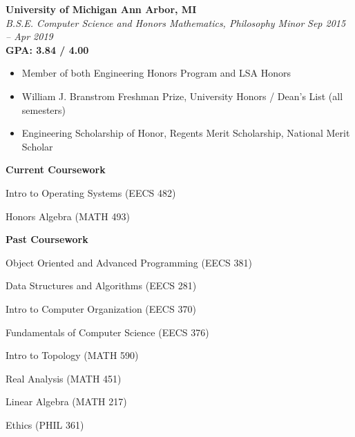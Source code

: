\documentclass[margin,line]{resume}
\begin{document}
\begin{resume}
    \textbf{University of Michigan \hfill Ann Arbor, MI} \\\vspace{1mm}%
    \textsl{B.S.E. Computer Science and Honors Mathematics, Philosophy Minor} \hfill \textsl{Sep 2015 -- Apr 2019} \\
    \textbf{GPA: 3.84 / 4.00} \\\vspace{-3.5mm}
    \begin{itemize}    
    \item Member of both Engineering Honors Program and LSA Honors
    \item William J. Branstrom Freshman Prize, University Honors / Dean's List (all semesters)
    \item Engineering Scholarship of Honor, Regents Merit Scholarship, National Merit Scholar
    \end{itemize}
    \vspace{-6mm}
    \begin{center} \textbf{Current Coursework} \end{center}
    \vspace{-3.5mm}
    \begin{itemize}
\begin{minipage}[t]{.66\linewidth}
    \item Intro to Operating Systems (EECS 482)
\end{minipage}%
\begin{minipage}[t]{.5\linewidth}
    \item Honors Algebra (MATH 493)
\end{minipage}
\end{itemize}

\vspace{-10mm}
    \begin{center} \textbf{Past Coursework} \end{center}
    \vspace{-4mm}
    \begin{itemize}
    \begin{minipage}[t]{.66\linewidth}
    \item Object Oriented and Advanced Programming (EECS 381)
    \item Data Structures and Algorithms (EECS 281)
    \item Intro to Computer Organization (EECS 370)
    \item Fundamentals of Computer Science (EECS 376)
\end{minipage}%
\begin{minipage}[t]{.5\linewidth}
    \item Intro to Topology (MATH 590)
    \item Real Analysis (MATH 451)
    \item Linear Algebra (MATH 217)
    \item Ethics (PHIL 361)
\end{minipage}
\end{itemize}
\vspace{-1.5mm}


\end{resume}
\end{document}
